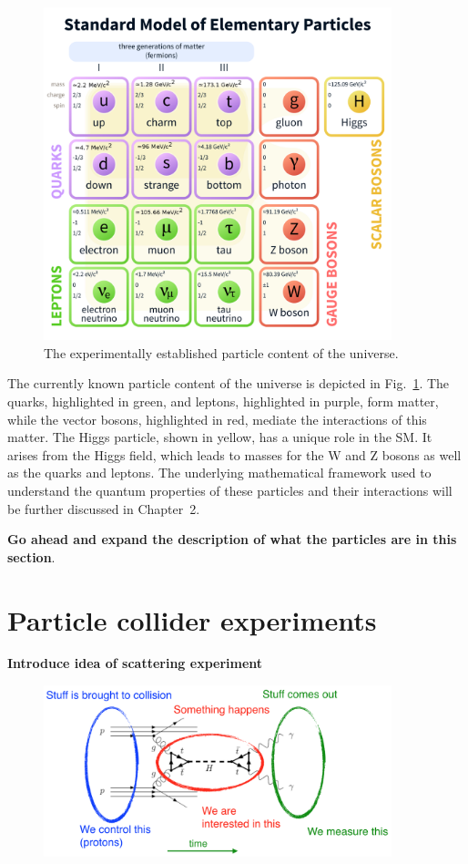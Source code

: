 \begin{figure}[htbp]
  \centering
   \includegraphics[width=0.9\textwidth]{figures/Chapter1/ChartOfParticles.png}
  \caption{
    The experimentally established particle content of the universe.
  }
 \label{fig:theparticles}
\end{figure}

The currently known particle content of the universe is depicted in Fig.~\ref{fig:theparticles}.
The quarks, highlighted in green, and leptons, highlighted in purple,
form matter, while the vector bosons, highlighted in red, mediate the 
interactions of this matter. The Higgs particle, shown in yellow,
has a unique role in the SM. It arises from the Higgs field, which
leads to masses for the W and Z bosons as well as the quarks and leptons.
The underlying mathematical framework used to understand the quantum 
properties of these particles and their interactions will be further discussed
in Chapter~2. 

\textbf{Go ahead and expand the description of what the particles are in this section}.

\section{Particle collider experiments}
\textbf{Introduce idea of scattering experiment}

\begin{figure}[htbp]
  \centering
   \includegraphics[width=0.9\textwidth]{figures/Chapter1/ScatteringExperiment.png}
  \caption{
  }
 \label{fig:scattering}
\end{figure}

